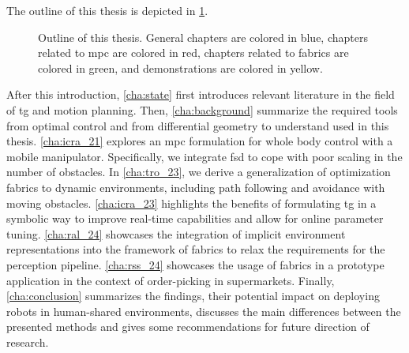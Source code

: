 The outline of this thesis is depicted in \cref{fig:outline}.
%
\begin{figure}[ht]
  \begin{center}
    
  \end{center}
  \caption{Outline of this thesis. General chapters are
  colored in blue, chapters related to \ac{mpc} are colored
  in red, chapters related to \ac{fabrics} are colored in 
  green, and demonstrations are colored in yellow.}
  \label{fig:outline}
\end{figure}
After this introduction, \cref{cha:state} first introduces
relevant literature in the field of \ac{tg}
and motion planning.
Then, \cref{cha:background} summarize the required tools
from optimal control and from differential geometry to
understand used in this thesis.
\cref{cha:icra_21} explores an \ac{mpc}
formulation for whole body control
with a mobile manipulator. Specifically, we integrate
\acl{fsd} to cope with poor scaling in the number of
obstacles.
In \cref{cha:tro_23}, we derive a
generalization of optimization fabrics to dynamic
environments, including path following and avoidance with
moving obstacles.
\cref{cha:icra_23} highlights the benefits of
formulating \ac{tg} in a symbolic way to
improve real-time capabilities and allow for online
parameter tuning.
\cref{cha:ral_24} showcases the integration of
implicit environment representations into the framework of
\ac{fabrics} to relax the requirements for the
perception pipeline.
\cref{cha:rss_24} showcases the 
usage of \ac{fabrics} in a prototype application in the
context of order-picking in supermarkets.
Finally,
\cref{cha:conclusion} summarizes the findings, their potential impact
on deploying robots in human-shared environments, discusses
the main differences between the presented methods and gives some
recommendations for future direction of research.


